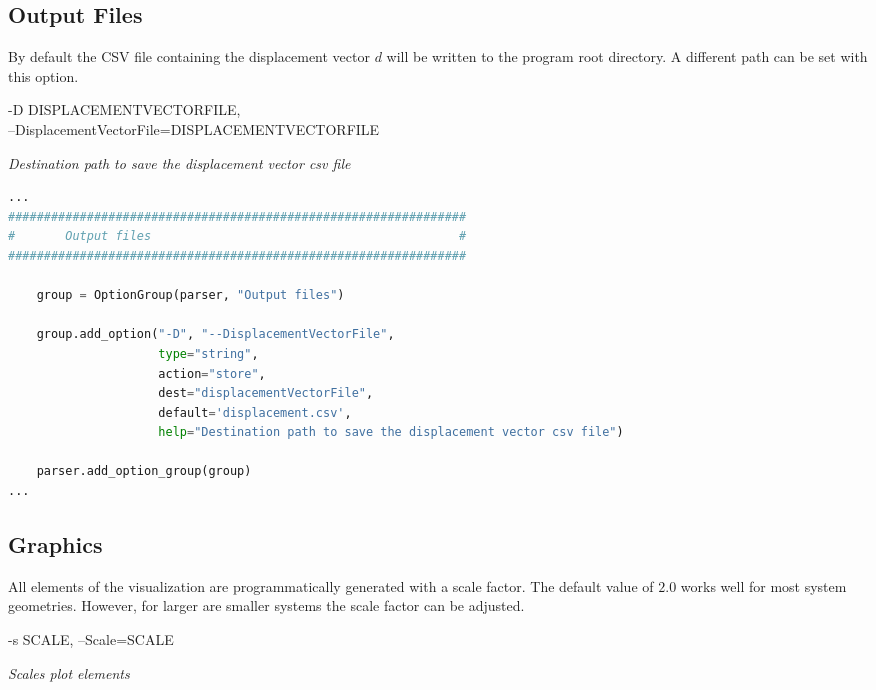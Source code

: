 \subsection{Output Files}
\label{subsec:outputFiles}

By default the CSV file containing the displacement vector $d$ will be written to the program root directory. A different path can be set with this option.

\begin{addmargin}[2em]{1em}
-D DISPLACEMENTVECTORFILE,\\
--DisplacementVectorFile=DISPLACEMENTVECTORFILE 

\textit{Destination path to save the displacement vector csv file}
\end{addmargin}

\begin{inconsolata}
\begin{minipage}{\linewidth}
\begin{lstlisting}[language=python]
...
################################################################
#       Output files                                           #
################################################################

    group = OptionGroup(parser, "Output files")

    group.add_option("-D", "--DisplacementVectorFile",
                     type="string",
                     action="store",
                     dest="displacementVectorFile",
                     default='displacement.csv',
                     help="Destination path to save the displacement vector csv file")

    parser.add_option_group(group)
...
\end{lstlisting}
\end{minipage}
\end{inconsolata}


\subsection{Graphics}
\label{subsec:graphics}

All elements of the visualization are programmatically generated with a scale factor. The default value of $2.0$ works well for most system geometries. However, for larger are smaller systems the scale factor can be adjusted.

\begin{addmargin}[2em]{1em}
-s SCALE, --Scale=SCALE

\textit{Scales plot elements}
\end{addmargin}

